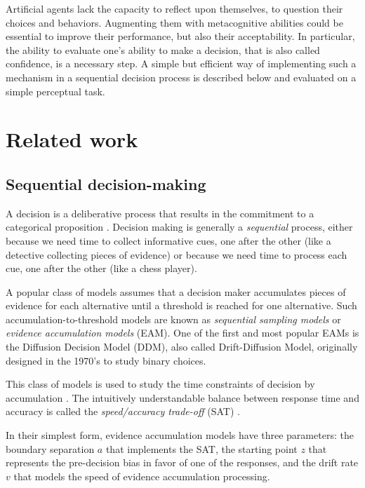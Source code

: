 \documentclass{esannV2}
\begin{document}
Artificial agents lack the capacity to reflect upon themselves, to question their choices and behaviors. Augmenting them with metacognitive abilities could be essential to improve their performance, but also their acceptability. In particular, the ability to evaluate one's ability to make a decision, that is also called confidence, is a necessary step. A simple but efficient way of implementing such a mechanism in a sequential decision process is described below and evaluated on a simple perceptual task.

\section{Related work}

\subsection{Sequential decision-making}

A decision is a deliberative process that results in the commitment to a categorical proposition \cite{goldNeuralBasisDecision2007}. Decision making is generally a \textit{sequential} process, either because we need time to collect informative cues, one after the other (like a detective collecting pieces of evidence) or because we need time to process each cue, one after the other (like a chess player). 

A popular class of models assumes that a decision maker accumulates pieces of evidence for each alternative until a threshold is reached for one alternative. Such accumulation-to-threshold models are known as \textit{sequential sampling models} or \textit{evidence accumulation models} (EAM). One of the first and most popular EAMs is the Diffusion Decision Model (DDM), also called Drift-Diffusion Model, originally designed in the 1970's \cite{Ratcliff1978ATO} to study binary choices.

This class of models is used to study the time constraints of decision by accumulation \cite{forstmannSequentialSamplingModels2016}. The intuitively understandable balance between response time and accuracy is called the \textit{speed/accuracy trade-off} (SAT) \cite{heitzSpeedaccuracyTradeoffHistory2014}.

In their simplest form, evidence accumulation models have three parameters: the boundary separation $a$ that implements the SAT, the starting point $z$ that represents the pre-decision bias in favor of one of the responses, and the drift rate $v$ that models the speed of evidence accumulation processing.
\end{document}
